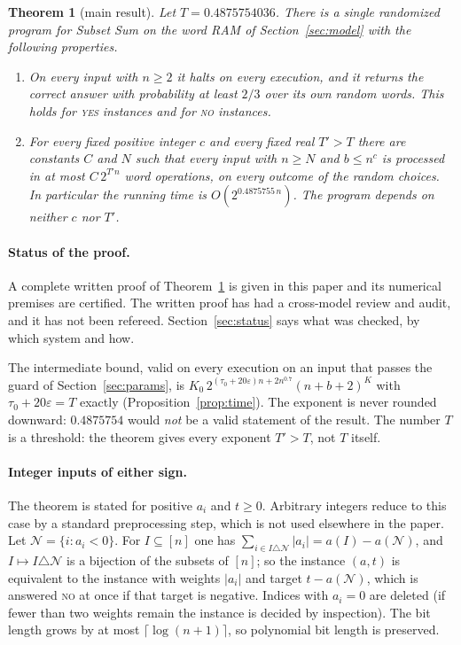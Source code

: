 \documentclass[11pt]{article}
\newtheorem{theorem}{Theorem}
\theoremstyle{definition}
\newcommand{\eps}{\varepsilon}
\newcommand{\abs}[1]{\lvert #1\rvert}
\newcommand{\ceil}[1]{\lceil #1\rceil}
\begin{document}
\begin{theorem}[main result]\label{thm:main}
Let $T=0.4875754036$. There is a single randomized program for Subset Sum on the word RAM of
Section~\ref{sec:model} with the following properties.
\begin{enumerate}[label=\textup{(\alph*)}]
\item On every input with $n\ge2$ it halts on every execution, and it returns the correct answer with probability at
least $2/3$ over its own random words. This holds for \textsc{yes} instances and for \textsc{no} instances.
\item For every fixed positive integer $c$ and every fixed real $T'>T$ there are constants $C$ and $N$ such that
every input with $n\ge N$ and $b\le n^c$ is processed in at most $C\,2^{T'n}$ word operations, on every outcome of
the random choices. In particular the running time is $O(2^{0.4875755\,n})$. The program depends on neither $c$ nor
$T'$.
\end{enumerate}
\end{theorem}

\paragraph{Status of the proof.} A complete written proof of Theorem~\ref{thm:main} is given in this paper and its
numerical premises are certified. The written proof has had a cross-model review and audit, and it has not been
refereed. Section~\ref{sec:status} says what was checked, by which system and how.

The intermediate bound, valid on every execution on an input that passes the guard of Section~\ref{sec:params}, is
$K_0\,2^{(\tau_0+20\eps)n+2n^{0.7}}(n+b+2)^{K}$ with $\tau_0+20\eps=T$ exactly (Proposition~\ref{prop:time}).
The exponent is never rounded downward: $0.4875754$ would \emph{not} be a valid statement of the result. The
number $T$ is a threshold: the theorem gives every exponent $T'>T$, not $T$ itself.

\paragraph{Integer inputs of either sign.} The theorem is stated for positive $a_i$ and $t\ge0$. Arbitrary integers
reduce to this case by a standard preprocessing step, which is not used elsewhere in the paper. Let
$\mathcal N=\{i:a_i<0\}$. For $I\subseteq[n]$ one has $\sum_{i\in I\triangle\mathcal N}\abs{a_i}=a(I)-a(\mathcal N)$,
and $I\mapsto I\triangle\mathcal N$ is a bijection of the subsets of $[n]$; so the instance $(a,t)$ is equivalent
to the instance with weights $\abs{a_i}$ and target $t-a(\mathcal N)$, which is answered \textsc{no} at once if
that target is negative. Indices with $a_i=0$ are deleted (if fewer than two weights remain the instance is decided
by inspection). The bit length grows by at most $\ceil{\log(n+1)}$, so polynomial bit length is preserved.
\end{document}
